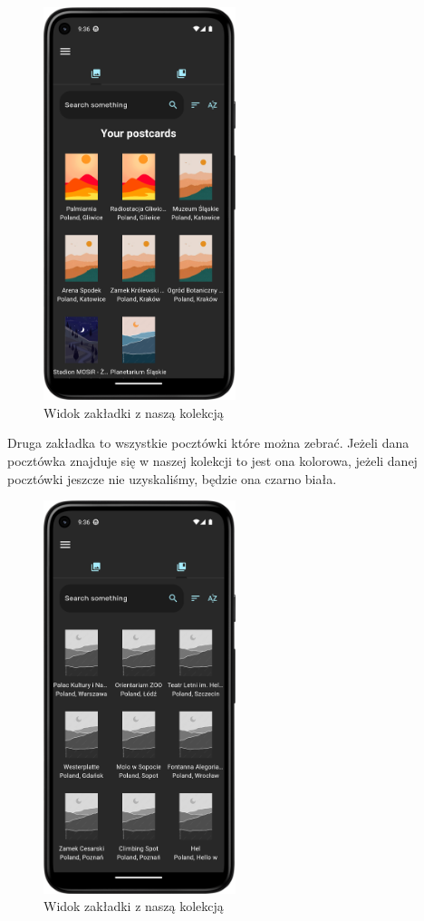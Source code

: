 \documentclass[a4paper,twoside,12pt]{book}
\begin{document}
\begin{figure}[H]
    \centering
    \includegraphics[width=0.5\textwidth]{mobile_ss/obrazki_nasze.png}
    \caption{Widok zakładki z naszą kolekcją}
\end{figure}

Druga zakładka to wszystkie pocztówki które można zebrać. Jeżeli dana pocztówka znajduje się w naszej kolekcji to jest ona kolorowa, jeżeli danej pocztówki jeszcze nie uzyskaliśmy, będzie ona czarno biała. 

\begin{figure}[H]
    \centering
    \includegraphics[width=0.5\textwidth]{mobile_ss/obrazki_wszystkie.png}
    \caption{Widok zakładki z naszą kolekcją}
\end{figure}
\end{document}
